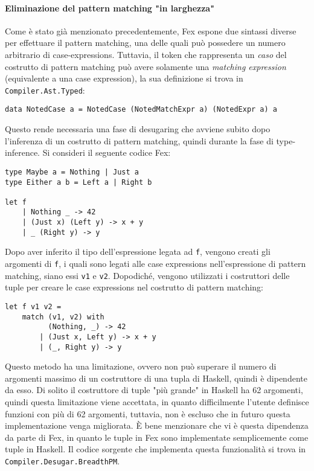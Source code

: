 \documentclass[10pt,a4paper]{article}
\begin{document}
\hypertarget{Eliminazione del pattern matching "in larghezza"}{\paragraph{Eliminazione del pattern matching "in larghezza"}}
Come è stato già menzionato precedentemente, Fex espone due sintassi diverse per effettuare il pattern matching,
una delle quali può possedere un numero arbitrario di case-expressions. Tuttavia, il token che rappresenta un
\textit{caso} del costrutto di pattern matching può avere solamente una \textit{matching expression} (equivalente
a una case expression), la sua definizione si trova in \texttt{Compiler.Ast.Typed}:
\begin{lstlisting}
data NotedCase a = NotedCase (NotedMatchExpr a) (NotedExpr a) a
\end{lstlisting}
Questo rende necessaria una fase di desugaring che avviene subito dopo l'inferenza di un costrutto di pattern matching,
quindi durante la fase di type-inference. Si consideri il seguente codice Fex:
\begin{lstlisting}
type Maybe a = Nothing | Just a
type Either a b = Left a | Right b

let f
    | Nothing _ -> 42
    | (Just x) (Left y) -> x + y
    | _ (Right y) -> y
\end{lstlisting}
Dopo aver inferito il tipo dell'espressione legata ad \texttt{f}, vengono creati gli argomenti di \texttt{f}, i quali
sono legati alle case expressions nell'espressione di pattern matching, siano essi \texttt{v1} e \texttt{v2}. Dopodiché,
vengono utilizzati i costruttori delle tuple per creare le case expressions nel costrutto di pattern matching:
\begin{lstlisting}
let f v1 v2 =
    match (v1, v2) with
          (Nothing, _) -> 42
        | (Just x, Left y) -> x + y
        | (_, Right y) -> y
\end{lstlisting}
Questo metodo ha una limitazione, ovvero non può superare il numero di argomenti massimo di un costruttore di una tupla
di Haskell, quindi è dipendente da esso. Di solito il costruttore di tuple "più grande" in Haskell ha 62 argomenti, quindi
questa limitazione viene accettata, in quanto difficilmente l'utente definisce funzioni con più di 62 argomenti, tuttavia,
non è escluso che in futuro questa implementazione venga migliorata. \`E bene menzionare che vi è questa dipendenza da
parte di Fex, in quanto le tuple in Fex sono implementate semplicemente come tuple in Haskell. Il codice sorgente che
implementa questa funzionalità si trova in \texttt{Compiler.Desugar.BreadthPM}.
\end{document}
